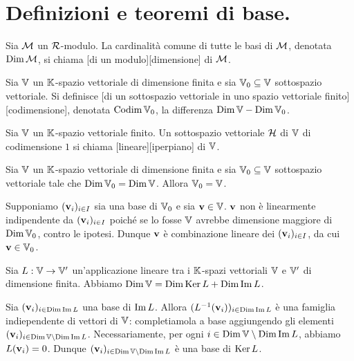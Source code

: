 \section{Definizioni e teoremi di base.}
\label{GeometriaLineare_DefinizioniETeoremiDiBase}
\begin{Definition}
	Sia $\mathcal{M}$ un $\mathcal{R}$-modulo. La cardinalit\`a comune di tutte
	le basi di $\mathcal{M}$, denotata $\operatorname{\operatorname{Dim}}{\mathcal{M}}$, si chiama
	[di un modulo][dimensione] di $\mathcal{M}$.
\end{Definition}
\begin{Definition}
	Sia $\mathbb{V}$ un $\mathbb{K}$-spazio vettoriale di dimensione finita e sia $\mathbb{V}_0 \subseteq \mathbb{V}$ sottospazio vettoriale. Si definisce [di un sottospazio vettoriale in uno spazio vettoriale finito][codimensione], denotata $\operatorname{Codim}{\mathbb{V}_0}$, la differenza $\operatorname{\operatorname{Dim}}{\mathbb{V}} - \operatorname{\operatorname{Dim}}{\mathbb{V}_0}$.
\end{Definition}
\begin{Definition}
	Sia $\mathbb{V}$ un $\mathbb{K}$-spazio vettoriale finito. Un sottospazio vettoriale $\mathcal{H}$ di $\mathbb{V}$ di codimensione $1$ si chiama [lineare][iperpiano] di $\mathbb{V}$.
\end{Definition}
\begin{Theorem}
	Sia $\mathbb{V}$ un $\mathbb{K}$-spazio vettoriale di dimensione finita e sia $\mathbb{V}_0 \subseteq \mathbb{V}$ sottospazio vettoriale tale che $\operatorname{\operatorname{Dim}}{\mathbb{V}_0} = \operatorname{\operatorname{Dim}}{\mathbb{V}}$. Allora $\mathbb{V}_0 = \mathbb{V}$.
\end{Theorem}
\Proof Supponiamo $(\mathbf{v}_i)_{i \in I}$ sia una base di $\mathbb{V}_0$ e sia $\mathbf{v} \in \mathbb{V}$. $\mathbf{v}$ non \`e linearmente indipendente da $(\mathbf{v}_i)_{i \in I}$ poich\'e se lo fosse $\mathbb{V}$ avrebbe dimensione maggiore di $\operatorname{\operatorname{Dim}}{\mathbb{V}_0}$, contro le ipotesi. Dunque $\mathbf{v}$ \`e combinazione lineare dei $(\mathbf{v}_i)_{i \in I}$, da cui $\mathbf{v} \in \mathbb{V}_0$. \EndProof
\begin{Theorem}
	Sia $L: \mathbb{V} \rightarrow \mathbb{V}'$ un'applicazione lineare tra i $\mathbb{K}$-spazi vettoriali $\mathbb{V}$ e $\mathbb{V}'$ di dimensione finita. Abbiamo $\operatorname{\operatorname{Dim}}{\mathbb{V}} = \operatorname{\operatorname{Dim}}{\operatorname{Ker}{L}} + \operatorname{\operatorname{Dim}}{\operatorname{Im}{L}}$.
\end{Theorem}
\Proof Sia $(\mathbf{v}_i)_{i \in \operatorname{\operatorname{Dim}}{\operatorname{Im}{L}}}$ una base di $\operatorname{Im}{L}$. Allora $(L^{-1}(\mathbf{v}_i))_{i \in \operatorname{\operatorname{Dim}}{\operatorname{Im}{L}}}$ \`e una famiglia indiependente di vettori di $\mathbb{V}$:  completiamola a base aggiungendo gli elementi $(\mathbf{v}_i)_{i \in \operatorname{\operatorname{Dim}}{\mathbb{V}} \setminus \operatorname{\operatorname{Dim}}{\operatorname{Im}{L}}}$. Necessariamente, per ogni $i \in \operatorname{\operatorname{Dim}}{\mathbb{V}} \setminus \operatorname{\operatorname{Dim}}{\operatorname{Im}{L}}$, abbiamo $L(\mathbf{v}_i) = 0$. Dunque $(\mathbf{v}_i)_{i \in \operatorname{\operatorname{Dim}}{\mathbb{V}} \setminus \operatorname{\operatorname{Dim}}{\operatorname{Im}{L}}}$ \`e una base di $\operatorname{Ker}{L}$. \EndProof
